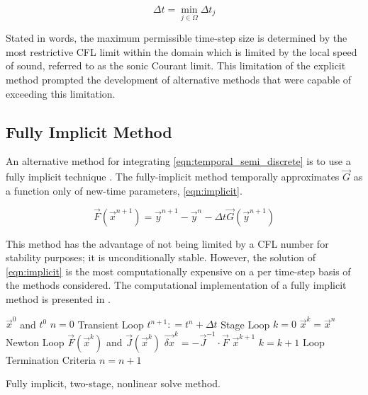 \begin{equation}
\label{eqn:global_cfl}
\Delta t = \min_{j \in \Omega} \Delta t_j
\end{equation}

Stated in words, the maximum permissible time-step size is determined by the most restrictive CFL limit within the domain which is limited by the local speed of sound, referred to as the sonic Courant limit.
This limitation of the explicit method prompted the development of alternative methods that were capable of exceeding this limitation.

\subsection{Fully Implicit Method}
\label{subsect:numerics_fully_implicit}
An alternative method for integrating \eqref{eqn:temporal_semi_discrete} is to use a fully implicit technique \cite{Frepoli2003, Barre1990}.
The fully-implicit method temporally approximates $\vec{G}$ as a function only of new-time parameters, \eqref{eqn:implicit}.

\begin{equation}
\label{eqn:implicit}
\vec{F}(\vec{x}^{n+1}) = \vec{y}^{n+1} - \vec{y}^{n} - \Delta t \vec{G}(\vec{y}^{n+1})
\end{equation}

This method has the advantage of not being limited by a CFL number for stability purposes; it is unconditionally stable.
However, the solution of \eqref{eqn:implicit} is the most computationally expensive on a per time-step basis of the methods considered.
The computational implementation of a fully implicit method is presented in .

\begin{algo}[H]
\setlength{\baselineskip}{0.625\baselineskip}
\begin{algorithmic}[1]
\Require $\vec{x}^{0}$ and $t^{0}$
\Set $n = 0$
\Loop \; Transient Loop
    \State $t^{n+1} : = t^{n} + \Delta t$
     \; Stage Loop
    \State $k = 0$
    \State $\vec{x}^{k} = \vec{x}^{n}$
    \Loop \; Newton Loop
		\Calculate $\vec{F}(\vec{x}^{k})$ and $\vec{J}(\vec{x}^{k})$
		\Calculate $\vec{\delta x}^k = - \vec{J}^{-1}\cdot\vec{F}$
		\BlackBox $\vec{x}^{k+1}$
		\State $k = k + 1$
		\BlackBox Loop Termination Criteria
	\EndLoop	
	\EndFor
	\State $n = n + 1$
\EndLoop
\end{algorithmic}
\caption{Fully implicit, two-stage, nonlinear solve method.}
\label{algo:implicit}
\end{algo}

